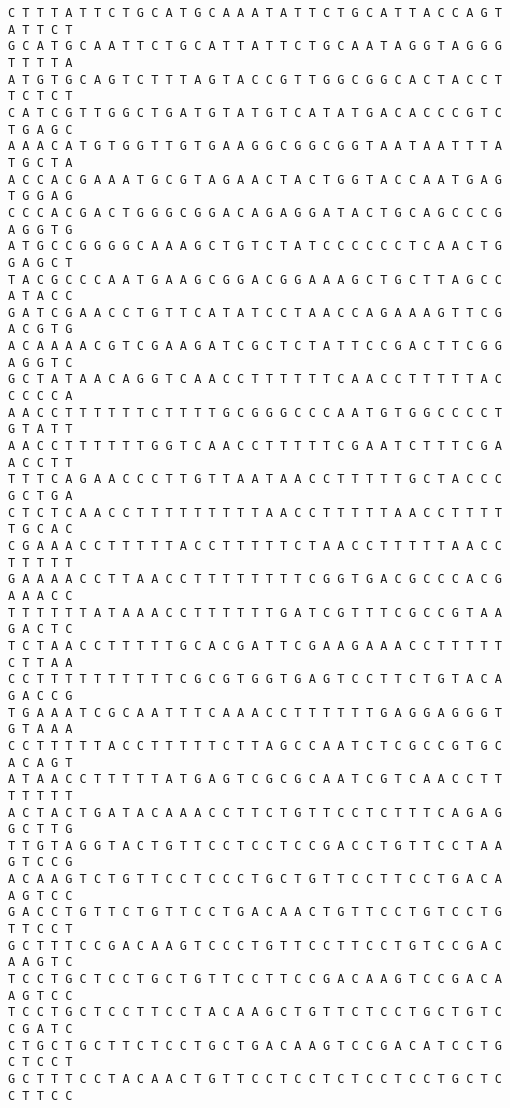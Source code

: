 \documentclass[11pt]{article}
\begin{document}
\begin{Verbatim}[commandchars=\\\{\}]
C T T T A T T C T G C A T G C A A A T A T T C T G C A T T A C C A G T A T T C T
G C A T G C A A T T C T G C A T T A T T C T G C A A T A G G T A G G G T T T T A
A T G T G C A G T C T T T A G T A C C G T T G G C G G C A C T A C C T T C T C T
C A T C G T T G G C T G A T G T A T G T C A T A T G A C A C C C G T C T G A G C
A A A C A T G T G G T T G T G A A G G C G G C G G T A A T A A T T T A T G C T A
A C C A C G A A A T G C G T A G A A C T A C T G G T A C C A A T G A G T G G A G
C C C A C G A C T G G G C G G A C A G A G G A T A C T G C A G C C C G A G G T G
A T G C C G G G G C A A A G C T G T C T A T C C C C C C T C A A C T G G A G C T
T A C G C C C A A T G A A G C G G A C G G A A A G C T G C T T A G C C A T A C C
G A T C G A A C C T G T T C A T A T C C T A A C C A G A A A G T T C G A C G T G
A C A A A A C G T C G A A G A T C G C T C T A T T C C G A C T T C G G A G G T C
G C T A T A A C A G G T C A A C C T T T T T T C A A C C T T T T T A C C C C C A
A A C C T T T T T T C T T T T G C G G G C C C A A T G T G G C C C C T G T A T T
A A C C T T T T T T G G T C A A C C T T T T T C G A A T C T T T C G A A C C T T
T T T C A G A A C C C T T G T T A A T A A C C T T T T T G C T A C C C G C T G A
C T C T C A A C C T T T T T T T T T A A C C T T T T T A A C C T T T T T G C A C
C G A A A C C T T T T T A C C T T T T T C T A A C C T T T T T A A C C T T T T T
G A A A A C C T T A A C C T T T T T T T T C G G T G A C G C C C A C G A A A C C
T T T T T T A T A A A C C T T T T T T G A T C G T T T C G C C G T A A G A C T C
T C T A A C C T T T T T G C A C G A T T C G A A G A A A C C T T T T T C T T A A
C C T T T T T T T T T T C G C G T G G T G A G T C C T T C T G T A C A G A C C G
T G A A A T C G C A A T T T C A A A C C T T T T T T G A G G A G G G T G T A A A
C C T T T T T A C C T T T T T C T T A G C C A A T C T C G C C G T G C A C A G T
A T A A C C T T T T T A T G A G T C G C G C A A T C G T C A A C C T T T T T T T
A C T A C T G A T A C A A A C C T T C T G T T C C T C T T T C A G A G G C T T G
T T G T A G G T A C T G T T C C T C C T C C G A C C T G T T C C T A A G T C C G
A C A A G T C T G T T C C T C C C T G C T G T T C C T T C C T G A C A A G T C C
G A C C T G T T C T G T T C C T G A C A A C T G T T C C T G T C C T G T T C C T
G C T T T C C G A C A A G T C C C T G T T C C T T C C T G T C C G A C A A G T C
T C C T G C T C C T G C T G T T C C T T C C G A C A A G T C C G A C A A G T C C
T C C T G C T C C T T C C T A C A A G C T G T T C T C C T G C T G T C C G A T C
C T G C T G C T T C T C C T G C T G A C A A G T C C G A C A T C C T G C T C C T
G C T T T C C T A C A A C T G T T C C T C C T C T C C T C C T G C T C C T T C C

\end{Verbatim}
\end{document}
